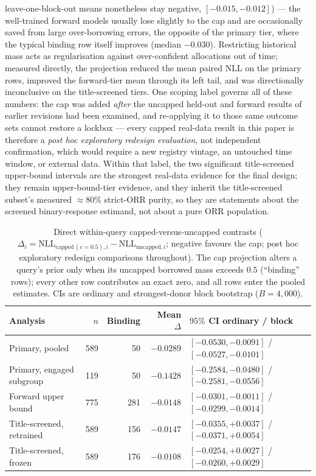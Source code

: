 \documentclass[11pt]{article}
\begin{document}
leave-one-block-out means nonetheless stay negative,
$[-0.015,-0.012]$) --- the well-trained forward models usually lose
slightly to the cap and are occasionally saved from large over-borrowing
errors, the opposite of the primary tier, where the typical binding row
itself improves (median $-0.030$). Restricting
historical mass acts
as regularisation against over-confident allocations out of time;
measured directly, the projection reduced the mean paired NLL on the
primary rows, improved the forward-tier mean through its left tail, and
was directionally
inconclusive on the title-screened tiers. One
scoping label governs all of these numbers: the cap was added
\emph{after} the uncapped held-out and forward results of earlier
revisions had been examined, and re-applying it to those same outcome sets
cannot restore a lockbox --- every capped real-data result in this paper
is therefore a \emph{post hoc exploratory redesign evaluation}, not
independent confirmation, which would require a new registry vintage, an
untouched time window, or external data. Within that label, the two
significant title-screened upper-bound intervals are the strongest
real-data evidence for the final design; they remain upper-bound-tier
evidence, and they inherit the title-screened subset's measured
$\approx 80\%$ strict-ORR purity, so they are statements about the
screened binary-response estimand, not about a pure ORR population.

\begin{table}[htbp]
\centering
\small
\caption{Direct within-query capped-versus-uncapped contrasts
($\Delta_i = \mathrm{NLL}_{\mathrm{capped}\,(c=0.5),i} -
\mathrm{NLL}_{\mathrm{uncapped},i}$; negative favours the cap; post hoc
exploratory redesign comparisons throughout). The cap projection alters
a query's prior only when its uncapped borrowed mass exceeds $0.5$
(``binding'' rows); every other row contributes an exact zero, and all
rows enter the pooled estimates. CIs are ordinary and strongest-donor
block bootstrap ($B = 4{,}000$).}
\label{tab:directpaired}
\setlength{\tabcolsep}{4.5pt}
\begin{tabular}{lrrrl}
\toprule
Analysis & $n$ & Binding & Mean $\Delta$ & $95\%$ CI ordinary / block \\
\midrule
Primary, pooled & 589 & 50 & $-0.0289$ & $[-0.0530,-0.0091]$ / $[-0.0527,-0.0101]$ \\
Primary, engaged subgroup & 119 & 50 & $-0.1428$ & $[-0.2584,-0.0480]$ / $[-0.2581,-0.0556]$ \\
Forward upper bound & 775 & 281 & $-0.0148$ & $[-0.0301,-0.0011]$ / $[-0.0299,-0.0014]$ \\
Title-screened, retrained & 589 & 156 & $-0.0147$ & $[-0.0355,+0.0037]$ / $[-0.0371,+0.0054]$ \\
Title-screened, frozen & 589 & 176 & $-0.0108$ & $[-0.0254,+0.0027]$ / $[-0.0260,+0.0029]$ \\
\bottomrule
\end{tabular}
\end{table}
\end{document}
